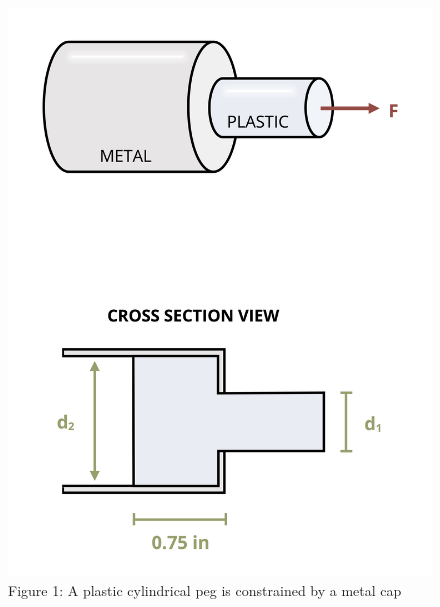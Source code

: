 \documentclass[
  letterpaper,
  DIV=11,
  numbers=noendperiod]{scrreprt}
\begin{document}
\begin{figure}[H]

{\centering \includegraphics{images/144.png}

}

\caption{Figure 1: A plastic cylindrical peg is constrained by a metal
cap}

\end{figure}%
\end{document}
